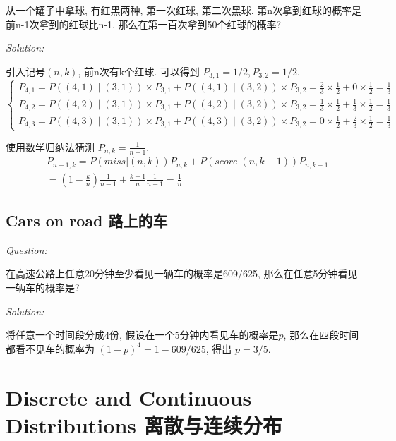 \documentclass[12pt]{book}
\begin{document}
 从一个罐子中拿球, 有红黑两种, 第一次红球, 第二次黑球. 第n次拿到红球的概率是前n-1次拿到的红球比n-1. 那么在第一百次拿到50个红球的概率?
 
 \noindent \textit{Solution:} 
 
 引入记号$(n,k)$, 前n次有k个红球. 可以得到 $P_{3,1}=1/2, P_{3,2}=1/2$. $$\left\{\begin{array}{l}P_{4,1}=P((4,1)\mid(3,1))\times P_{3,1}+P((4,1)\mid(3,2))\times P_{3,2}=\frac{2}{3}\times\frac{1}{2}+0\times\frac{1}{2}=\frac{1}{3}\\P_{4,2}=P((4,2)\mid(3,1))\times P_{3,1}+P((4,2)\mid(3,2))\times P_{3,2}=\frac{1}{3}\times\frac{1}{2}+\frac{1}{3}\times\frac{1}{2}=\frac{1}{3}\\P_{4,3}=P((4,3)\mid(3,1))\times P_{3,1}+P((4,3)\mid(3,2))\times P_{3,2}=0\times\frac{1}{2}+\frac{2}{3}\times\frac{1}{2}=\frac{1}{3}\end{array}\right.$$
 
 使用数学归纳法猜测 $P_{n,k}=\frac{1}{n-1}$. $$\begin{aligned}&P_{n+1,k}=P\left(miss|(n,k)\right)P_{n,k}+P\left(score|(n,k-1)\right)P_{n,k-1}\\&=\left(1-\frac{k}{n}\right)\frac{1}{n-1}+\frac{k-1}{n}\frac{1}{n-1}=\frac{1}{n}\end{aligned}$$
 
    \subsection{Cars on road 路上的车}
\noindent \textit{Question:}
 
 在高速公路上任意20分钟至少看见一辆车的概率是609/625, 那么在任意5分钟看见一辆车的概率是?
 
 \noindent \textit{Solution:} 
 
 将任意一个时间段分成4份, 假设在一个5分钟内看见车的概率是$p$, 那么在四段时间都看不见车的概率为 $(1-p)^4=1-609/625$, 得出 $p=3/5$.
 
 \section{Discrete and Continuous Distributions 离散与连续分布} 
 
\end{document}
